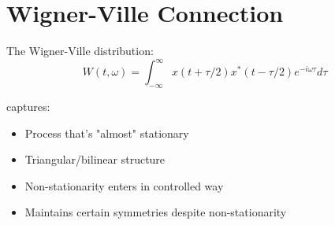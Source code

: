 \documentclass[12pt]{article}
\begin{document}
\section{Wigner-Ville Connection}
The Wigner-Ville distribution:
\[ W(t,\omega) = \int_{-\infty}^{\infty} x(t + \tau/2)x^*(t - \tau/2)e^{-i\omega\tau}d\tau \]

captures:
\begin{itemize}
\item Process that's "almost" stationary
\item Triangular/bilinear structure
\item Non-stationarity enters in controlled way
\item Maintains certain symmetries despite non-stationarity
\end{itemize}
\end{document}
